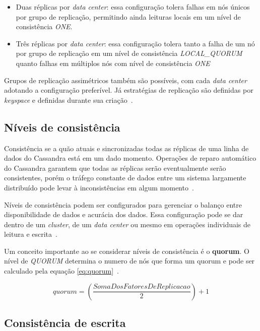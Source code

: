 \begin{itemize}

\item Duas réplicas por \emph{data center}: essa configuração tolera falhas em nós únicos por grupo de replicação, permitindo ainda leituras locais em um nível de consistência \emph{ONE}.

\item Três réplicas por \emph{data center}: essa configuração tolera tanto a falha de um nó por grupo de replicação em um nível de consistência \emph{LOCAL\_QUORUM} quanto falhas em múltiplos nós com nível de consistência \emph{ONE}

\end{itemize}

Grupos de replicação assimétricos também são possíveis, com cada \emph{data center} adotando a configuração preferível. Já estratégias de replicação são definidas por \emph{keyspace} e definidas durante sua criação~\cite{cassandradocs}.

\subsection*{Níveis de consistência}

Consistência se a quão atuais e sincronizadas todas as réplicas de uma linha de dados do Cassandra está em um dado momento. Operações de reparo automático do Cassandra garantem que todas as réplicas serão eventualmente serão consistentes, porém o tráfego constante de dados entre um sistema largamente distribuído pode levar à inconsistências em algum momento~\cite{cassandradocs}.

Níveis de consistência podem ser configurados para gerenciar o balanço entre disponibilidade de dados e acurácia dos dados. Essa configuração pode se dar dentro de um \emph{cluster}, de um \emph{data center} ou mesmo em operações individuais de leitura e escrita~\cite{cassandradocs}.

Um conceito importante ao se considerar níveis de consistência é o \textbf{quorum}. O nível de \emph{QUORUM} determina o numero de nós que forma um quorum e pode ser calculado pela equação \ref{eq:quorum}~\cite{cassandradocs}.

\begin{equation} \label{eq:quorum}
quorum = ( \frac{Soma Dos Fatores De Replicacao}{2}) + 1
\end{equation}


\subsection*{Consistência de escrita}

